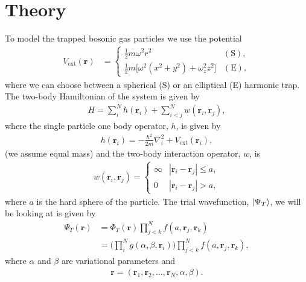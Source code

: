 \documentclass[
    a4paper, aps, twocolumn, floatfix, superscriptaddress]{revtex4-1}
\newcommand{\vf}{\mathbf}
\newcommand{\1}{\mathds{1}}
\newcommand{\half}{\frac{1}{2}}
\begin{document}
\section{Theory}
    To model the trapped bosonic gas particles we use the potential
    \begin{align}
        V_{\text{ext}}(\vf{r})
        &=
        \begin{cases}
            \half m\omega^2r^2 & (\text{S}), \\
            \half m \bigl[
                \omega^2(x^2 + y^2) + \omega_z^2z^2
            \bigr] & (\text{E}),
        \end{cases}
    \end{align}
    where we can choose between a spherical (S) or an elliptical (E) harmonic
    trap. The two-body Hamiltonian of the system is given by
    \begin{align}
        H = \sum_{i}^{N}h(\vf{r}_i) + \sum_{i < j}^{N}w(\vf{r}_i, \vf{r}_j),
    \end{align}
    where the single particle one body operator, $h$, is given by
    \begin{align}
        h(\vf{r}_i) = -\frac{\hbar^2}{2m}\nabla_i^2
        + V_{\text{ext}}(\vf{r}_i),
    \end{align}
    (we assume equal mass)
    and the two-body interaction operator, $w$, is
    \begin{align}
        w(\vf{r}_i, \vf{r}_j)
        = \begin{cases}
            \infty & |\vf{r}_i - \vf{r}_j| \leq a, \\
            0 & |\vf{r}_i - \vf{r}_j| > a,
        \end{cases}
    \end{align}
    where $a$ is the hard sphere of the particle. The trial wavefunction,
    $\ket{\Psi_T}$, we will
    be looking at is given by
    \begin{align}
        \Psi_T(\vf{r})
        &= \Phi_T(\vf{r})
        \prod_{j < k}^N f(a, \vf{r}_j, \vf{r}_k) \\
        &= \Biggl(
            \prod_i^N g(\alpha, \beta, \vf{r}_i)
        \Biggr)
        \prod_{j < k}^N f(a, \vf{r}_j, \vf{r}_k),
        \label{eq:initial_trial_wavefunction}
    \end{align}
    where $\alpha$ and $\beta$ are variational parameters and
    \begin{align}
        \vf{r} = (\vf{r}_1, \vf{r}_2, \dots, \vf{r}_N, \alpha, \beta).
    \end{align}
\end{document}
